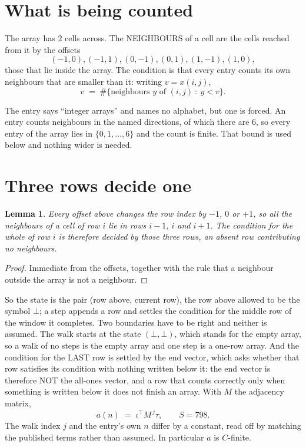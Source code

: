 \documentclass[11pt,a4paper]{article}
\theoremstyle{plain}
\newtheorem{lemma}[theorem]{Lemma}
\theoremstyle{definition}
\begin{document}
\section{What is being counted}

The array has $2$ cells across. The NEIGHBOURS of a cell are the cells reached from it by the
offsets
\[
(-1,0), (-1,1), (0,-1), (0,1), (1,-1), (1,0),
\]
those that lie inside the array. The condition is that every entry counts its own neighbours
that are smaller than it: writing $v=x(i,j)$,
\[
v\;=\;\#\{\text{neighbours } y \text{ of } (i,j)\ :\ y<v\} .
\]

The entry says ``integer arrays'' and names no alphabet, but one is forced. An entry counts
neighbours in the named directions, of which there are $6$, so every entry of the array
lies in $\{0,1,\dots,6\}$ and the count is finite. That bound is used below and
nothing wider is needed.

\section{Three rows decide one}

\begin{lemma}\label{lem:win}
Every offset above changes the row index by $-1$, $0$ or $+1$, so all the neighbours of a cell
of row $i$ lie in rows $i-1$, $i$ and $i+1$. The condition for the whole of row $i$ is
therefore decided by those three rows, an absent row contributing no neighbours.
\end{lemma}

\begin{proof}
Immediate from the offsets, together with the rule that a neighbour outside the array is not a
neighbour.
\end{proof}

So the state is the pair (row above, current row), the row above allowed to be the symbol
$\bot$; a step appends a row and settles the condition for the middle row of the window it
completes. Two boundaries have to be right and neither is assumed. The walk starts at the state
$(\bot,\bot)$, which stands for the empty array, so a walk of no steps is the empty array and
one step is a one-row array. And the condition for the LAST row is settled by the end vector,
which asks whether that row satisfies its condition with nothing written below it: the end
vector is therefore NOT the all-ones vector, and a row that counts correctly only when
something is written below it does not finish an array. With $M$ the adjacency matrix,
\[
a(n)\;=\;\iota^{\!\top}M^{\,j}\tau ,\qquad S=798.
\]
The walk index $j$ and the entry's own $n$ differ by a constant, read off by matching the
published terms rather than assumed. In particular $a$ is $C$-finite.
\end{document}
